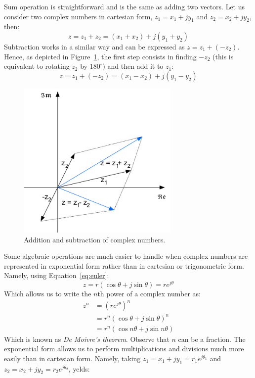 Sum operation is straightforward and is the same as adding two vectors. Let us consider two complex numbers in cartesian form, $z_1 = x_1 + jy_1$ and $z_2 = x_2 + jy_2$, then:
\[z = z_1 + z_2 = (x_1 + x_2) + j(y_1 + y_2)\]
Subtraction works in a similar way and can be expressed as $z = z_1 + (-z_2)$. Hence, as depicted in Figure~\ref{Fig:Complex_algebra}, the first step consists in finding $-z_2$ (this is equivalent to rotating $z_2$ by $180^{\circ}$) and then add it to $z_1$:
\[z = z_1 + (-z_2) = (x_1 - x_2) + j(y_1 - y_2)\]
\begin{figure}[h!]
  \centering
  \includegraphics[width=0.7\textwidth]{"images/Complex_algebra"}
  \caption{Addition and subtraction of complex numbers.} 
  \label{Fig:Complex_algebra}
\end{figure}
Some algebraic operations are much easier to handle when complex numbers are represented in exponential form rather than in cartesian or trigonometric form. Namely, using Equation~\ref{eq:euler}:
\begin{equation}
z = r\left(\cos\theta + j\sin\theta\right)=re^{j\theta} 
\end{equation}
Which allows us to write the $n$th power of a complex number as:
\begin{equation}
\begin{split}
z^n &= \left(re^{j\theta}\right)^n\\   
    &= r^n\left(\cos\theta + j\sin\theta\right)^n\\
    &= r^n\left(\cos n\theta + j\sin n\theta\right)
\end{split}
\end{equation}
Which is known as \emph{De Moivre's theorem}. Observe that $n$ can be a fraction. The exponential form allows us to perform multiplications and divisions much more easily than in cartesian form. Namely, taking $z_1 = x_1 + jy_1 = r_1e^{j\theta_1}$ and $z_2 = x_2 + jy_2 = r_2e^{j\theta_2}$, yelds:

